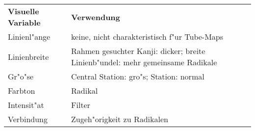 \begin{table}[h]
\begin{tabular}{ll}

\textbf{Visuelle Variable} & \textbf{Verwendung}                                                          \\
Linienl"ange       & keine, nicht charakteristisch f"ur Tube-Maps                                    \\
Linienbreite      & Rahmen gesuchter Kanji: dicker; breite Linienb"undel: mehr gemeinsame Radikale \\
Gr"o"se             & Central Station: gro"s; Station: normal                                       \\
Farbton           & Radikal                                                                        \\
Intensit"at       & Filter                                                                          \\
Verbindung    & Zugeh"origkeit zu Radikalen                                                                       \\
\end{tabular}
\end{table}
